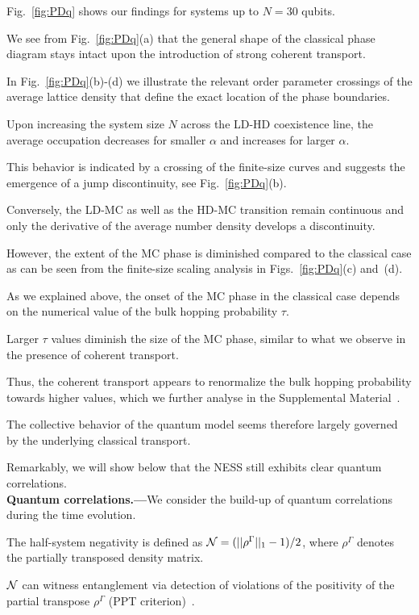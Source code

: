 \documentclass[aps,prl,twocolumn,groupedaddress,superscriptaddress,colorlinks,bookmarks=false,citecolor=darkspringgreen,linkcolor=darkolivegreen,urlcolor=navyblue]{revtex4-1}
\begin{document}
Fig.~\ref{fig:PDq} shows our findings for systems up to $N=30$ qubits.


We see from Fig.~\ref{fig:PDq}(a) that the general shape of the classical phase diagram stays intact upon the introduction of strong coherent transport.

In Fig.~\ref{fig:PDq}(b)-(d) we illustrate the relevant order parameter crossings of the average lattice density that define the exact location of the phase boundaries.

Upon increasing the system size $N$ across the LD-HD coexistence line, the  average occupation decreases for smaller $\alpha$ and increases for larger $\alpha$.

This behavior is indicated by a crossing of the finite-size curves and suggests the emergence of a jump discontinuity, see Fig.~\ref{fig:PDq}(b).

Conversely, the LD-MC as well as the HD-MC transition remain continuous and only the derivative of the average number density develops a discontinuity.

However, the extent of the MC phase is diminished compared to the classical case as can be seen from the finite-size scaling analysis in Figs.~\ref{fig:PDq}(c) and~(d).

As we explained above, the onset of the MC phase in the classical case depends on the numerical value of the bulk hopping probability $\tau$.

Larger $\tau$ values diminish the size of the MC phase, similar to what we observe in the presence of coherent transport.

Thus, the coherent transport appears to renormalize the bulk hopping probability towards higher values, which we further analyse in the Supplemental Material~\cite{SM}.

The collective behavior of the quantum model seems therefore largely governed by the underlying classical transport.

Remarkably, we will show below that the NESS still exhibits clear quantum correlations.\\


{\bf Quantum correlations.---}We consider the build-up of quantum correlations during the time evolution.

The half-system negativity is defined as ${\cal N}= (||\rho^\Gamma||_1-1)/2 $, where $\rho^\Gamma$ denotes the partially transposed density matrix.

${\cal N}$ can witness entanglement via detection of violations of the positivity of the partial transpose $\rho^\Gamma$ (PPT criterion)~\cite{Vidal02,Plenio05}.
\end{document}
